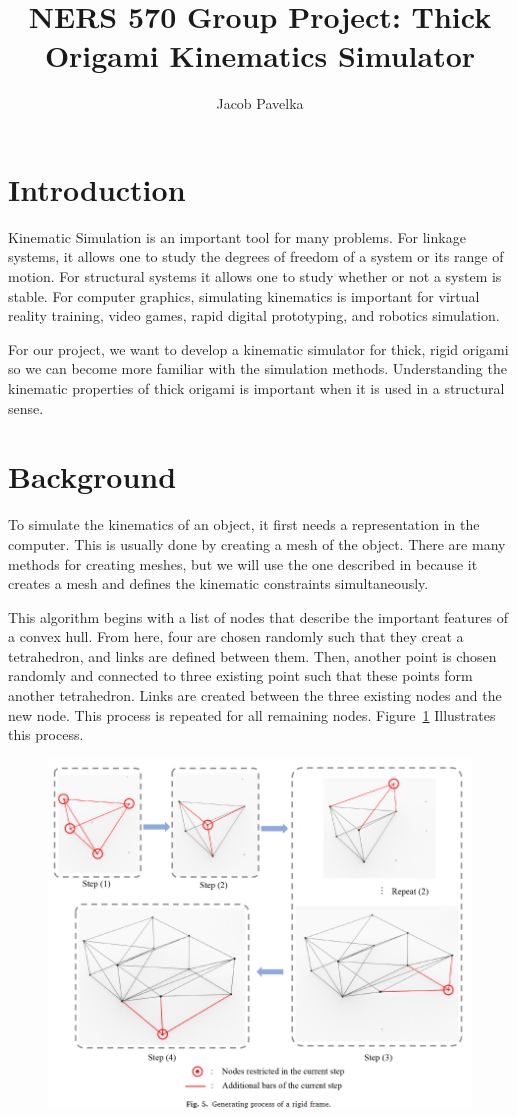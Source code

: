 \documentclass{report}
\title{NERS 570 Group Project: Thick Origami Kinematics Simulator}
\author{Jacob Pavelka}
\begin{document}
\maketitle
\section*{Introduction}
Kinematic Simulation is an important tool for many problems. For linkage systems, it allows one to study the degrees of freedom of a system or its range of motion.
For structural systems it allows one to study whether or not a system is stable.
For computer graphics, simulating kinematics is important for virtual reality training, video games, rapid digital prototyping, and robotics simulation\cite{SiggraphContact22}.

For our project, we want to develop a kinematic simulator for thick, rigid origami so we can become more familiar with the simulation methods. Understanding the kinematic properties of thick origami is important when it is used in a structural sense.

\section*{Background}
To simulate the kinematics of an object, it first needs a representation in the computer. This is usually done by creating a mesh of the object. There are many methods for creating meshes, but we will use the one described in \cite{zhang2021folding} because it creates a mesh and defines the kinematic constraints simultaneously.

This algorithm begins with a list of nodes that describe the important features of a convex hull. From here, four are chosen randomly such that they creat a tetrahedron, and links are defined between them. Then, another point is chosen randomly and connected to three existing point such that these points form another tetrahedron. Links are created between the three existing nodes and the new node. This process is repeated for all remaining nodes. Figure~\ref{fig:mesh_gen} Illustrates this process.



\begin{figure}[!h]
    \includegraphics{mesh_gen.png}
\label{fig:mesh_gen}
\end{figure}


\end{document}
